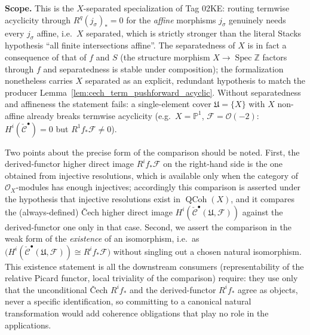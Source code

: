\begin{lemma}
  \textbf{Scope.} This is the \(X\)-separated specialization of Tag 02KE: routing
  termwise acyclicity through \(R^q(j_\sigma)_* = 0\) for the \emph{affine} morphisms
  \(j_\sigma\) genuinely needs every \(j_\sigma\) affine, i.e.\ \(X\) separated, which
  is strictly stronger than the literal Stacks hypothesis ``all finite intersections
  affine''. The separatedness of \(X\) is in fact a consequence of that of \(f\) and
  \(S\) (the structure morphism \(X \to \operatorname{Spec}\mathbb{Z}\) factors through
  \(f\) and separatedness is stable under composition); the formalization nonetheless
  carries \(X\) separated as an explicit, redundant hypothesis to match the producer
  Lemma~\ref{lem:cech_term_pushforward_acyclic}. Without separatedness and affineness
  the statement fails: a single-element cover \(\mathfrak{U} = \{X\}\) with \(X\)
  non-affine already breaks termwise acyclicity (e.g.\ \(X = \mathbb{P}^1\),
  \(\mathcal{F} = \mathcal{O}(-2)\): \(H^i(\check{\mathcal{C}}^\bullet) = 0\) but
  \(R^1 f_*\mathcal{F} \neq 0\)).

  Two points about the precise form of the comparison should be noted. First, the
  derived-functor higher direct image \(R^i f_*\mathcal{F}\) on the right-hand side
  is the one obtained from injective resolutions, which is available only when the
  category of \(\mathcal{O}_X\)-modules has enough injectives; accordingly this
  comparison is asserted under the hypothesis that injective resolutions exist in
  \(\operatorname{QCoh}(X)\), and it compares the (always-defined) {\v C}ech higher
  direct image \(H^i(\check{\mathcal{C}}^\bullet(\mathfrak{U}, \mathcal{F}))\)
  against the derived-functor one only in that case. Second, we assert the comparison in the
  weak form of the \emph{existence} of an isomorphism, i.e.\ as
  \(\bigl(H^i(\check{\mathcal{C}}^\bullet(\mathfrak{U}, \mathcal{F})) \cong
  R^i f_*\mathcal{F}\bigr)\) without singling out a chosen natural isomorphism.
  This existence statement is all the downstream consumers (representability of the
  relative Picard functor, local triviality of the comparison) require: they use
  only that the unconditional {\v C}ech \(R^i f_*\) and the derived-functor
  \(R^i f_*\) agree as objects, never a specific identification, so committing to a
  canonical natural transformation would add coherence obligations that play no
  role in the applications.
\end{lemma}

